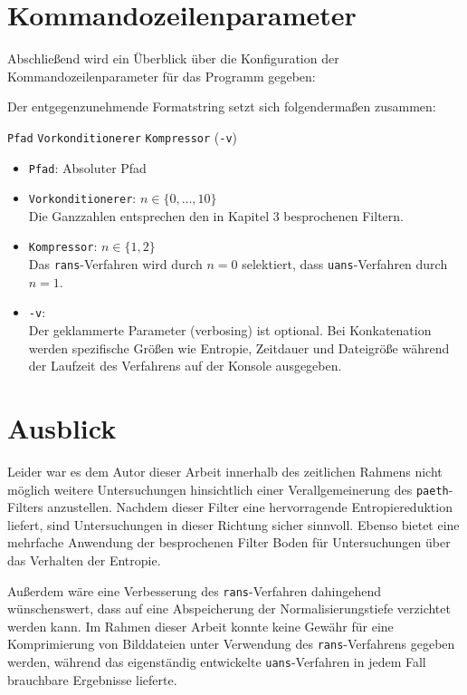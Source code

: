 \documentclass[a4paper,12pt]{article}
\begin{document}
\section{Kommandozeilenparameter}\label{Kommandozeilenparameter}
Abschließend wird ein Überblick über die Konfiguration der Kommandozeilenparameter für das Programm gegeben:
\par
Der entgegenzunehmende Formatstring setzt sich folgendermaßen zusammen:
\begin{center}
{\tt{Pfad}} {\tt{Vorkonditionerer}} {\tt{Kompressor}} ({\tt{-v}}) 
\end{center}
\begin{itemize}
	\item {\tt{Pfad}}: Absoluter Pfad 
	\item {\tt{Vorkonditionerer}}: $n\in \{0,\ldots, 10\}$
	\\
	Die Ganzzahlen entsprechen den in Kapitel 3 besprochenen Filtern.
	\item {\tt{Kompressor}}: $n\in\{1,2\}$
	\\
	Das {\tt{rans}}-Verfahren wird durch $n=0$ selektiert, dass {\tt{uans}}-Verfahren durch $n=1$.
	\item {\tt{-v}}:
	\\
Der geklammerte Parameter (verbosing) ist optional. Bei Konkatenation werden spezifische Größen wie Entropie, Zeitdauer und Dateigröße während der Laufzeit des Verfahrens auf der Konsole ausgegeben.
\end{itemize} 
\newpage
\section{Ausblick}
Leider war es dem Autor dieser Arbeit innerhalb des zeitlichen Rahmens nicht möglich weitere Untersuchungen hinsichtlich einer Verallgemeinerung des {\tt{paeth}}-Filters anzustellen. Nachdem dieser Filter eine hervorragende Entropiereduktion liefert, sind Untersuchungen in dieser Richtung sicher sinnvoll. Ebenso bietet eine mehrfache Anwendung der besprochenen Filter Boden für Untersuchungen über das Verhalten der Entropie. 
\par
Außerdem wäre eine Verbesserung des {\tt{rans}}-Verfahren dahingehend wünschenswert, dass auf eine Abspeicherung der Normalisierungstiefe verzichtet werden kann. Im Rahmen dieser Arbeit konnte keine Gewähr für eine Komprimierung von Bilddateien unter Verwendung des {\tt{rans}}-Verfahrens gegeben werden, während das eigenständig entwickelte {\tt{uans}}-Verfahren in jedem Fall brauchbare Ergebnisse lieferte.  
\newpage
\end{document}
